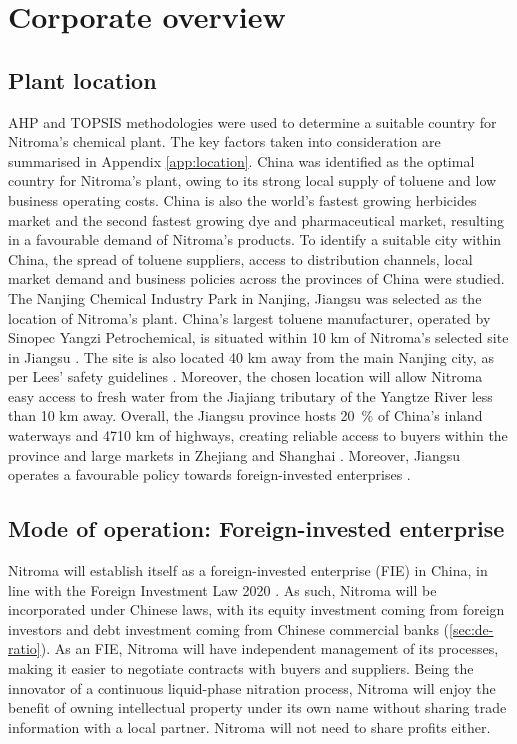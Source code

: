 \section{Corporate overview}
\subsection{Plant location}
\label{sec:location}
AHP and TOPSIS methodologies were used to determine a suitable country for Nitroma’s chemical plant. The key factors taken into consideration are summarised in Appendix \ref{app:location}. China was identified as the optimal country for Nitroma's plant, owing to its strong local supply of toluene and low business operating costs. China is also the world’s fastest growing herbicides market and the second fastest growing dye and pharmaceutical market, resulting in a favourable demand of Nitroma’s products. To identify a suitable city within China, the spread of toluene suppliers, access to distribution channels, local market demand and business policies across the provinces of China were studied. The Nanjing Chemical Industry Park in Nanjing, Jiangsu was selected as the location of Nitroma’s plant. China’s largest toluene manufacturer, operated by Sinopec Yangzi Petrochemical, is situated within 10 km of Nitroma’s selected site in Jiangsu \cite{sinopec_group_sinopec_2014}. The site is also located 40 km away from the main Nanjing city, as per Lees' safety guidelines \cite{lees_lees_2012}. Moreover, the chosen location will allow Nitroma easy access to fresh water from the Jiajiang tributary of the Yangtze River less than 10 km away. Overall, the Jiangsu province hosts \SI{20}{\percent} of China’s inland waterways and 4710 km of highways, creating reliable access to buyers within the province and large markets in Zhejiang and Shanghai \cite{britannica_jiangsu_nodate}. Moreover, Jiangsu operates a favourable policy towards foreign-invested enterprises \cite{hktdc_sourcing_market_2008}.

\subsection{Mode of operation: Foreign-invested enterprise}
\label{sec:mode-of-operation}
Nitroma will establish itself as a foreign-invested enterprise (FIE) in China, in line with the Foreign Investment Law 2020 \cite{jones_day_china_2020}. As such, Nitroma will be incorporated under Chinese laws, with its equity investment coming from foreign investors and debt investment coming from Chinese commercial banks (\ref{sec:de-ratio}). As an FIE, Nitroma will have independent management of its processes, making it easier to negotiate contracts with buyers and suppliers. Being the innovator of a continuous liquid-phase nitration process, Nitroma will enjoy the benefit of owning intellectual property under its own name without sharing trade information with a local partner. Nitroma will not need to share profits either. 

